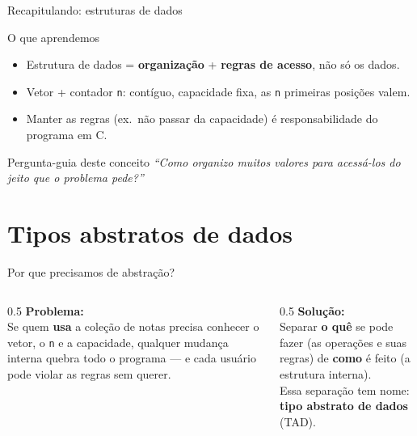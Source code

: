 \documentclass[aspectratio=169]{beamer}
\begin{document}
\begin{frame}{Recapitulando: estruturas de dados}
  \begin{block}{O que aprendemos}
    \begin{itemize}
      \item Estrutura de dados = \textbf{organização} + \textbf{regras de
        acesso}, não só os dados.
      \item Vetor + contador \texttt{n}: contíguo, capacidade fixa, as
        \texttt{n} primeiras posições valem.
      \item Manter as regras (ex.\ não passar da capacidade) é
        responsabilidade do programa em C.
    \end{itemize}
  \end{block}
  \begin{exampleblock}{Pergunta-guia deste conceito}
    \emph{``Como organizo muitos valores para acessá-los do jeito que o
    problema pede?''}
  \end{exampleblock}
\end{frame}

\section{Tipos abstratos de dados}

\begin{frame}{Por que precisamos de abstração?}
  \begin{columns}[T]
    \begin{column}{0.5\textwidth}
      \textbf{Problema:}\\[4pt]
      Se quem \textbf{usa} a coleção de notas precisa conhecer o vetor, o
      \texttt{n} e a capacidade, qualquer mudança interna quebra todo o
      programa --- e cada usuário pode violar as regras sem querer.
    \end{column}
    \begin{column}{0.5\textwidth}
      \textbf{Solução:}\\[4pt]
      Separar \textbf{o quê} se pode fazer (as operações e suas regras)
      de \textbf{como} é feito (a estrutura interna).\\[4pt]
      Essa separação tem nome: \textbf{tipo abstrato de dados} (TAD).
    \end{column}
  \end{columns}
\end{frame}
\end{document}
